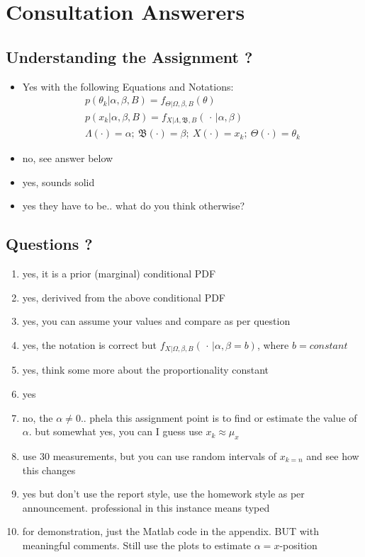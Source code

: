 \documentclass[a4paper,11pt]{article}
\begin{document}
\newpage
\appendix
\section{Consultation Answerers}


\subsection*{Understanding the Assignment ?}
\begin{itemize}
 \item Yes with the following Equations and Notations: 
 	\begin{eqnarray}
		p(\theta_k | \alpha, \beta, B) = f_{\Theta | \Omega, \beta, B}(\theta)\\
		p(x_k |\alpha, \beta, B) = f_{X | \Lambda, \mathfrak{B}, B}(\, \cdot \, | \alpha, \beta)\\
		\Lambda (\cdot) = \alpha;\: \mathfrak{B}(\cdot) = \beta ; \: X(\cdot) = x_k; \: \Theta ( \cdot) = \theta_k 
	\end{eqnarray}	
	\item no, see answer below
	\item yes, sounds solid
	\item yes they have to be.. what do you think otherwise?
\end{itemize}

\subsection*{Questions ?}
\begin{enumerate}
	\item yes, it is a prior (marginal) conditional PDF
	\item yes, derivived from the above conditional PDF
	\item yes, you can assume your values and compare as per question
	\item yes, the notation is correct but $f_{X | \Omega, \beta, B}( \, \cdot \, | \alpha, \beta = b)$, where $b = constant$
	\item yes, think some more about the proportionality constant
	\item yes
	\item no, the $\alpha \neq 0$.. phela this assignment point is to find or estimate the value of $\alpha$. but somewhat yes, you can I guess use $x_k \approx \mu_x$
	\item use 30 measurements, but you can use random intervals of $x_{k=n}$ and see how this changes
	\item yes but don't use the report style, use the homework style as per announcement. professional in this instance means typed
	\item for demonstration, just the Matlab code in the appendix. BUT with meaningful comments. Still use the plots to estimate $\alpha = x$-position
\end{enumerate}
\end{document}
